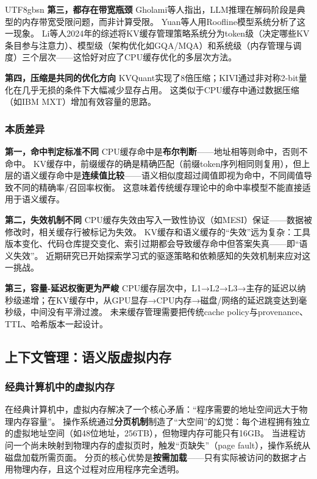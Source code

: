 \documentclass[11pt,a4paper]{article}
\begin{document}
\begin{CJK*}{UTF8}{gbsn}
\textbf{第三，都存在带宽瓶颈}
Gholami等人指出，LLM推理在解码阶段是典型的内存带宽受限问题，而非计算受限\cite{gholami2024memorywall}。
Yuan等人用Roofline模型系统分析了这一现象\cite{yuan2024llminference}。
Li等人2024年的综述将KV缓存管理策略系统分为token级（决定哪些KV条目参与注意力）、模型级（架构优化如GQA/MQA）和系统级（内存管理与调度）三个层次\cite{likvcache2024survey}——这恰好对应了CPU缓存优化的多层次方法。

\textbf{第四，压缩是共同的优化方向}
KVQuant实现了8倍压缩\cite{hooper2024kvquant}；KIVI通过非对称2-bit量化在几乎无损的条件下大幅减少显存占用\cite{liu2024kivi}。
这类似于CPU缓存中通过数据压缩（如IBM MXT）增加有效容量的思路。

\subsubsection{本质差异}

\textbf{第一，命中判定标准不同}
CPU缓存命中是\textbf{布尔判断}——地址相等则命中，否则不命中。
KV缓存中，前缀缓存的确是精确匹配（前缀token序列相同则复用），但上层的语义缓存命中是\textbf{连续值比较}——语义相似度超过阈值即视为命中，不同阈值导致不同的精确率/召回率权衡。
这意味着传统缓存理论中的命中率模型不能直接适用于语义缓存。

\textbf{第二，失效机制不同}
CPU缓存失效由写入一致性协议（如MESI）保证——数据被修改时，相关缓存行被标记为失效。
KV缓存和语义缓存的``失效''远为复杂：工具版本变化、代码仓库提交变化、索引过期都会导致缓存命中但答案失真——即``语义失效''。
近期研究已开始探索学习式的驱逐策略\cite{lpc2025}和依赖感知的失效机制\cite{multilevelcache2025}来应对这一挑战。

\textbf{第三，容量-延迟权衡更为严峻}
CPU缓存层次中，L1→L2→L3→主存的延迟以纳秒级递增；在KV缓存中，从GPU显存→CPU内存→磁盘/网络的延迟跳变达到毫秒级，中间没有平滑过渡。
未来缓存管理需要把传统cache policy与provenance、TTL、哈希版本一起设计。

\subsection{上下文管理：语义版虚拟内存}
\label{sec:memory}

\subsubsection{经典计算机中的虚拟内存}

在经典计算机中，虚拟内存解决了一个核心矛盾：``程序需要的地址空间远大于物理内存容量''。
操作系统通过\textbf{分页机制}制造了``大空间''的幻觉：每个进程拥有独立的虚拟地址空间（如48位地址，256TB），但物理内存可能只有16GB。
当进程访问一个尚未映射到物理内存的虚拟页时，触发``页缺失''（page fault），操作系统从磁盘加载所需页面。
分页的核心优势是\textbf{按需加载}——只有实际被访问的数据才占用物理内存，且这个过程对应用程序完全透明。


\end{CJK*}
\end{document}
